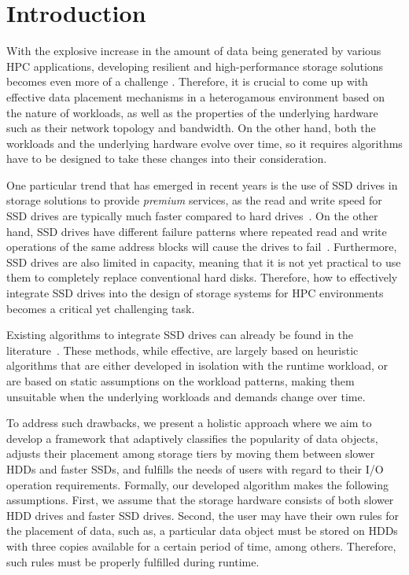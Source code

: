 \section{Introduction}
\label{intro}

With the explosive increase in the amount of data being generated by various HPC applications, developing resilient and high-performance storage solutions becomes even more of a challenge \cite{lofstead2010managing,DBLP:conf/mss/ZhuWLHLM13}. Therefore, it is crucial to come up with effective data placement mechanisms in a heterogamous environment based on the nature of workloads, as well as the properties of the underlying hardware such as their network topology and bandwidth. On the other hand, both the workloads and the underlying hardware evolve over time, so it requires algorithms have to be designed to take these changes into their consideration.

One particular trend that has emerged in recent years is the use of SSD drives in storage solutions to provide \emph{premium} services, as the read and write speed for SSD drives are typically much faster compared to hard drives~\cite{park2009performance}. On the other hand, SSD drives have different failure patterns where repeated read and write operations of the same address blocks will cause the drives to fail~\cite{chen2009understanding}. Furthermore, SSD drives are also limited in capacity, meaning that it is not yet practical to use them to completely replace conventional hard disks. Therefore, how to effectively integrate SSD drives into the design of storage systems for HPC environments becomes a critical yet challenging task.

Existing algorithms to integrate SSD drives can already be found in the literature~\cite{DBLP:conf/mss/WangHHZLH13, DBLP:conf/mss/LeeKKLPM13}. These methods, while effective, are largely based on heuristic algorithms that are either developed in isolation with the runtime workload, or are based on static assumptions on the workload patterns, making them unsuitable when the underlying workloads and demands change over time.

To address such drawbacks, we present a holistic approach where we aim to develop a framework that adaptively classifies the popularity of data objects, adjusts their placement among storage tiers by moving them between slower HDDs and faster SSDs, and fulfills the needs of users with regard to their I/O operation requirements. Formally, our developed algorithm makes the following assumptions. First, we assume that the storage hardware consists of both slower HDD drives and faster SSD drives. Second, the user may have their own rules for the placement of data, such as, a particular data object must be stored on HDDs with three copies available for a certain period of time, among others. Therefore, such rules must be properly fulfilled during runtime.

